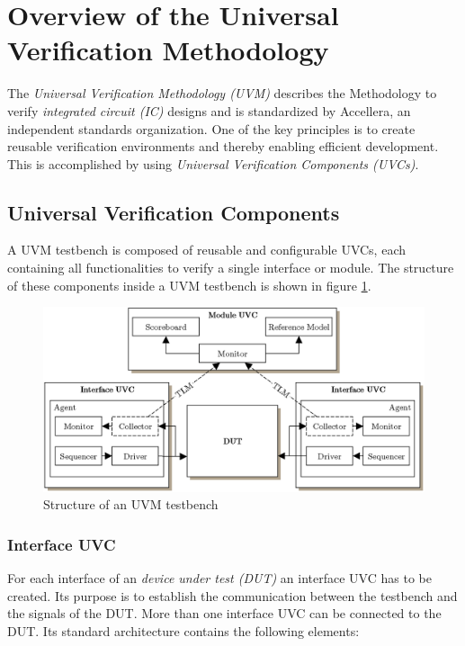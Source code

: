 \section{Overview of the Universal Verification Methodology}\label{uvm}

The \emph{Universal Verification Methodology (UVM)} describes the Methodology to
verify \emph{integrated circuit (IC)} designs and is standardized by Accellera,
an independent standards organization. One of the key principles is to create
reusable verification environments and thereby enabling efficient development.
This is accomplished by using \emph{Universal Verification Components (UVCs)}\cite{uvm_ml}.

\subsection{Universal Verification Components}\label{uvc}

A UVM testbench is composed of reusable and configurable UVCs, each
containing all functionalities to verify a single interface or module. The
structure of these components inside a UVM testbench is shown in figure
\ref{fig:UVM_testbench}.

\begin{figure}[htb]
 \centering
 \includegraphics[scale=0.3]{abb/UVM_testbench}
 \caption{Structure of an UVM testbench}
\label{fig:UVM_testbench}
\end{figure}

\subsubsection{Interface UVC}\label{interface_uvc}

For each interface of an \emph{device under test (DUT)} an interface UVC has
to be created. Its purpose is to establish the communication between
the testbench and the signals of the DUT. More than one interface UVC can be
connected to the DUT. Its standard architecture contains the following elements:

